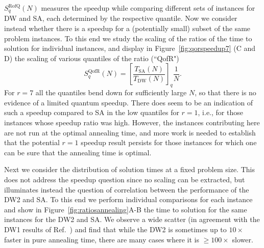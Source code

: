 $S^{\textrm{RofQ}}_q(N)$ measures the speedup while comparing different sets of instances for DW and SA, each determined by the respective quantile. Now we consider instead whether there is a speedup for a (potentially small) subset of the same problem instances. To this end we study the scaling of the ratios of the time to solution for individual instances, and display in Figure~\ref{fig:qorspeedup7} (C and D) the scaling of various quantiles of the ratio (``QofR")
\begin{equation}
S_q^{\textrm{QofR}}(N) = 
\left[\frac{T_{\textrm{SA}}(N)}{T_{\textrm{DW}}(N)}\right]_q \frac{1}{N} .
\label{eq:SQoR}
\end{equation}
For $r=7$ all the quantiles bend down for sufficiently large $N$, so that there is no evidence of a limited quantum speedup. There does seem to be an indication of such a speedup compared to SA in the low quantiles for $r=1$, i.e., for those instances whose speedup ratio was high. However, the instances contributing here are not run at the optimal annealing time, and more work is needed to establish that the potential $r=1$ speedup result persists for those instances for which one can be sure that the annealing time is optimal. 

Next we consider the distribution of solution times at a fixed problem size. This does not address the speedup question since no scaling can be extracted, but illuminates instead the question of correlation between the performance of the DW2 and SA. To this end we perform individual comparisons for each instance and show in Figure~\ref{fig:ratiosannealing}A-B the time to solution for the same instances for the DW2 and SA. We observe a wide scatter (in agreement with the DW1 results of Ref.~\cite{ourpaper}) and find that while the DW2 is sometimes up to $10\times$ faster in pure annealing time, there are many cases where it is $\geq 100\times$ slower. 


